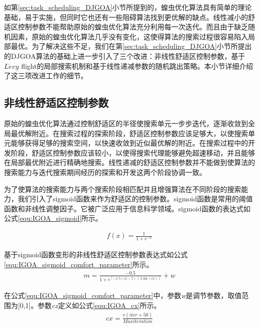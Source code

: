 如第\ref{sec:task_scheduling_DJGOA}小节所提到的，蝗虫优化算法具有简单的理论基础，易于实施，但同时它也还有一些阻碍算法找到更优解的缺点。线性减小的舒适区控制参数不能帮助原始的蝗虫优化算法充分利用每一次迭代。而且由于缺乏随机因素，原始的蝗虫优化算法几乎没有变化，这使得算法的搜索过程很容易陷入局部最优。为了解决这些不足，我们在第\ref{sec:task_scheduling_DJGOA}小节所提出的DJGOA算法的基础上进一步引入了三个改进：非线性舒适区控制参数，基于$L\acute{e}vy $ flight的局部搜索机制和基于线性递减参数的随机跳出策略。本小节详细介绍了这三项改进工作的细节。

\subsection{非线性舒适区控制参数}
原始的蝗虫优化算法通过控制舒适区的半径使搜索单元一步步迭代，逐渐收敛到全局最优解附近。在搜索过程的探索阶段，舒适区控制参数应该足够大，以使搜索单元能够获得足够的搜索空间，以快速收敛到近似最优解的附近。在搜索过程中的开发阶段，舒适区控制参数应该较小，以使得搜索代理能够避免超速移动，并且能够在局部最优附近进行精确地搜索。线性递减的舒适区控制参数并不能做到使算法的搜索能力与迭代搜索期间经历的探索和开发这两个阶段协调一致。

为了使算法的搜索能力与两个搜索阶段相匹配并且增强算法在不同阶段的搜索能力，我们引入了sigmoid函数来作为舒适区的控制参数。sigmoid函数是常用的阈值函数和非线性调整因子。它被广泛应用于信息科学领域。sigmoid函数的表达式如公式\ref{equ:IGOA_sigmoid}所示。

\begin{eqnarray}\label{equ:IGOA_sigmoid}
	f(x)=\frac{1}{1+e^{-x}}
\end{eqnarray}

基于sigmoid函数变形的非线性舒适区控制参数表达式如公式\ref{equ:IGOA_sigmoid_comfort_parameter}所示。
\begin{eqnarray}\label{equ:IGOA_sigmoid_comfort_parameter}
    m=\frac{-0.5}{1+e^{(-1.5(cx-5)+2\sin(cx))}}+w
\end{eqnarray}

在公式\ref{equ:IGOA_sigmoid_comfort_parameter}中，参数\emph{w}是调节参数，取值范围为[0,1]。参数\emph{cx}定义如公式\ref{equ:IGOA_cx}所示。
\begin{eqnarray}\label{equ:IGOA_cx}
	cx=\frac{v(iter+50)}{Maxiteration}
\end{eqnarray}

